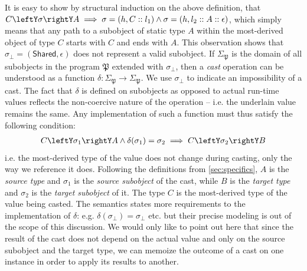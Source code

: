 It is easy to show by structural induction on the above definition, that 
$C\leftY\sigma\rightY A \implies \sigma=(h,C::l_1) \wedge \sigma=(h,l_2::A::\epsilon)$, 
which simply means that any path to a subobject of static type $A$ within the 
most-derived object of type $C$ starts with $C$ and ends with $A$. This 
observation shows that $\sigma_\bot = (\mathsf{Shared},\epsilon)$ does not 
represent a valid subobject. If $\Sigma_\mathfrak{P}$ is the domain of all subobjects in 
the program $\mathfrak{P}$ extended with $\sigma_\bot$, then a \emph{cast} operation can be 
understood as a function $\delta : \Sigma_\mathfrak{P} \rightarrow \Sigma_\mathfrak{P}$. We use 
$\sigma_\bot$ to indicate an impossibility of a cast. The fact that $\delta$ is 
defined on subobjects as opposed to actual run-time values reflects the 
non-coercive nature of the operation -- i.e. the underlain value remains the 
same. Any implementation of such a function must thus satisfy the following 
condition:
\begin{eqnarray*}
C \leftY\sigma_1\rightY A \wedge \delta(\sigma_1) = \sigma_2 \implies C \leftY\sigma_2\rightY B
\end{eqnarray*}
\noindent
i.e. the most-derived type of the value does not change during casting, only the way 
we reference it does. Following the definitions from 
\textsection\ref{sec:specifics}, $A$ is the \emph{source type} and $\sigma_1$ is 
the \emph{source subobject} of the cast, while $B$ is the \emph{target type} and 
$\sigma_2$ is the \emph{target subobject} of it. The type $C$ is the 
most-derived type of the value being casted. The \Cpp{} semantics states more 
requirements to the implementation of $\delta$: e.g. 
$\delta(\sigma_\bot) = \sigma_\bot$ etc. but their precise modeling is out of 
the scope of this discussion. We would only like to point out here that since 
the result of the cast does not depend on the actual value and only on the 
source subobject and the target type, we can memoize the outcome of a cast on 
one instance in order to apply its results to another.


